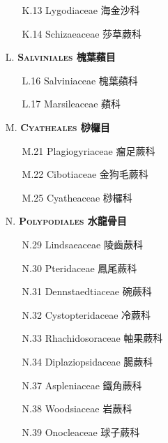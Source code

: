 \begin{enumerate}
    \begin{enumerate}
      \item[K.13] Lygodiaceae 海金沙科   
        
      \item[K.14] Schizaeaceae 莎草蕨科   
        
    \end{enumerate}
  \item[L. ] \textbf{\textsc{Salviniales} 槐葉蘋目} 
    \begin{enumerate}
      \item[L.16] Salviniaceae 槐葉蘋科   
        
      \item[L.17] Marsileaceae 蘋科   
        
    \end{enumerate}
  \item[M. ] \textbf{\textsc{Cyatheales} 桫欏目} 
    \begin{enumerate}
      \item[M.21] Plagiogyriaceae 瘤足蕨科   
        
      \item[M.22] Cibotiaceae 金狗毛蕨科   
        
      \item[M.25] Cyatheaceae 桫欏科   
        
    \end{enumerate}
  \item[N. ] \textbf{\textsc{Polypodiales} 水龍骨目} 
    \begin{enumerate}
      \item[N.29] Lindsaeaceae 陵齒蕨科   
        
      \item[N.30] Pteridaceae 鳳尾蕨科   
        
      \item[N.31] Dennstaedtiaceae 碗蕨科   
        
      \item[N.32] Cystopteridaceae 冷蕨科   
        
      \item[N.33] Rhachidosoraceae 軸果蕨科   
        
      \item[N.34] Diplaziopsidaceae 腸蕨科   
        
      \item[N.37] Aspleniaceae 鐵角蕨科   
        
      \item[N.38] Woodsiaceae 岩蕨科   
        
      \item[N.39] Onocleaceae 球子蕨科   
        

\end{enumerate}
\end{enumerate}
